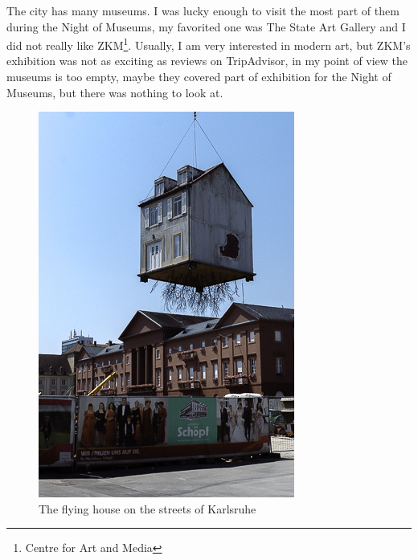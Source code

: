 \documentclass[english]{article}
\begin{document}
The city has many museums. I was lucky enough to visit the most part of them during the Night of Museums, my favorited one was The State Art Gallery and I did not really like ZKM\footnote{ Centre for Art and Media }. Usually, I am very interested in modern art, but ZKM's exhibition was not as exciting as reviews on TripAdvisor, in my point of view the museums is too empty, maybe they covered part of exhibition for the Night of Museums, but there was nothing to look at.

\begin{figure}
\centerline{\includegraphics[scale=0.45]{Germany_travel/karlsruhe}}
\caption{The flying house on the streets of Karlsruhe}
\end{figure}
\end{document}
